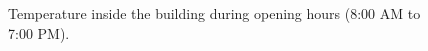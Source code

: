 \begin{figure}[p]
     	\centering
	\begin{fullpage}	
		 \\
		 \\
		\vspace{10pt}
		\caption[Temperature inside the building during opening hours]{Temperature inside the building during opening hours (8:00 AM to 7:00 PM).}
		\label{fig:thermal_int}    
	\end{fullpage}
\end{figure}


